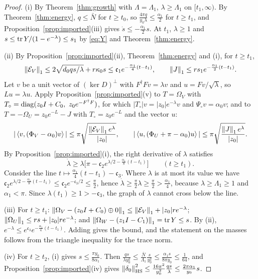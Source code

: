 \begin{proof}
(i) By Theorem~\ref{thm:growth} with $\Lambda=\Lambda_1$,
$\lambda\geq\Lambda_1$ on $[t_1,\infty)$. By Theorem~\ref{thm:energy},
$q\leq\bar N$ for $t\geq t_0$, so $\frac{4\pi q}{y_0\lambda}\leq\frac{\alpha_1}2$ for $t\geq t_1$, and
Proposition~\ref{prop:imported}(iii) gives $\dot s\leq-\frac{\alpha_1}2s$. At
$t_1$, $\lambda\geq1$ and $s\leq\operatorname{tr} Y/(1-e^{-\lambda})\leq s_1$ by
\eqref{eq:Y} and Theorem~\ref{thm:energy}.

(ii) By Proposition~\ref{prop:imported}(ii), Theorem~\ref{thm:energy} and
(i), for $t\geq t_1$,
\[
 \left\lVert\mathcal E_V\right\rVert_1\leq2\sqrt{d_0qs/\lambda}+r\kappa_0s
 \leq\mathfrak c_1e^{-\frac{\alpha_1}4(t-t_1)},
 \qquad\left\lVert J\right\rVert_1\leq rs_1e^{-\frac{\alpha_1}2(t-t_1)}.
\]
Let $v$ be a unit vector of $(\ker D)^\perp$ with $F^\dagger Fv=\lambda v$ and
$u=Fv/\sqrt\lambda$, so $Lu=\lambda u$. Apply
Proposition~\ref{prop:imported}(v) to $T=\Omega_V$ with
$T_\circ=\diag(z_0\id+C_0,\ z_0e^{-F^\dagger F})$, for which
$|T_\circ|v=|z_0|e^{-\lambda}v$ and $\Psi_\circ v=\alpha_0v$; and to
$T=-\Omega_U=z_0e^{-L}-J$ with $T_\circ=z_0e^{-L}$ and the vector $u$:
\[
 |\left\langle v,(\Phi_V-\alpha_0)v\right\rangle|\leq\pi\sqrt{\frac{\left\lVert\mathcal E_V\right\rVert_1e^\lambda}{|z_0|}},
 \qquad
 |\left\langle u,(\Phi_U+\pi-\alpha_0)u\right\rangle|\leq\pi\sqrt{\frac{\left\lVert J\right\rVert_1e^\lambda}{|z_0|}} .
\]
By Proposition~\ref{prop:imported}(i), the right derivative of $\lambda$
satisfies
\[
 \dot\lambda\geq\lambda\bigl[\pi-\mathfrak c_2e^{\lambda/2-\frac{\alpha_1}8(t-t_1)}\bigr]\qquad(t\geq t_1).
\]
Consider the line $t\mapsto\frac{\alpha_1}4(t-t_1)-\mathfrak c_3$. Where
$\lambda$ is at most its value we have
$\mathfrak c_2e^{\lambda/2-\frac{\alpha_1}8(t-t_1)}\leq\mathfrak c_2e^{-\mathfrak c_3/2}\leq\frac\pi2$,
hence $\dot\lambda\geq\frac\pi2\lambda\geq\frac\pi2>\frac{\alpha_1}4$, because
$\lambda\geq\Lambda_1\geq1$ and $\alpha_1<\pi$. Since
$\lambda(t_1)\geq1>-\mathfrak c_3$, the graph of $\lambda$ cannot cross below the line.

(iii) For $t\geq t_1$:
$\left\lVert\Omega_V-(z_0I+C_0)\oplus0\right\rVert_1\leq\left\lVert\mathcal E_V\right\rVert_1+|z_0|re^{-\lambda}$;
$\left\lVert\Omega_U\right\rVert_1\leq rs+|z_0|re^{-\lambda}$; and
$\left\lVert\Omega_W-(z_1I-C_1)\right\rVert_1=\operatorname{tr} Y\leq s$. By (ii),
$e^{-\lambda}\leq e^{\mathfrak c_3}e^{-\frac{\alpha_1}4(t-t_1)}$. Adding gives the
bound, and the statement on the masses follows from the triangle inequality
for the trace norm.

(iv) For $t\geq t_2$, (i) gives $s\leq\frac{\pi y_0}{8\alpha_1}$. Then
$\frac{qs}{\lambda y_0^2}\leq\frac{\bar N}{\Lambda_1}\frac s{y_0^2}
\leq\frac{\alpha_1s}{8\pi y_0}\leq\frac1{64}$, and
Proposition~\ref{prop:imported}(iv) gives
$\left\lVert\delta_0\right\rVert_{\mathrm{HS}}^2\leq\frac{16\pi^2}{y_0^2}\frac{qs}\lambda
\leq\frac{2\pi\alpha_1}{y_0}s$.
\end{proof}

